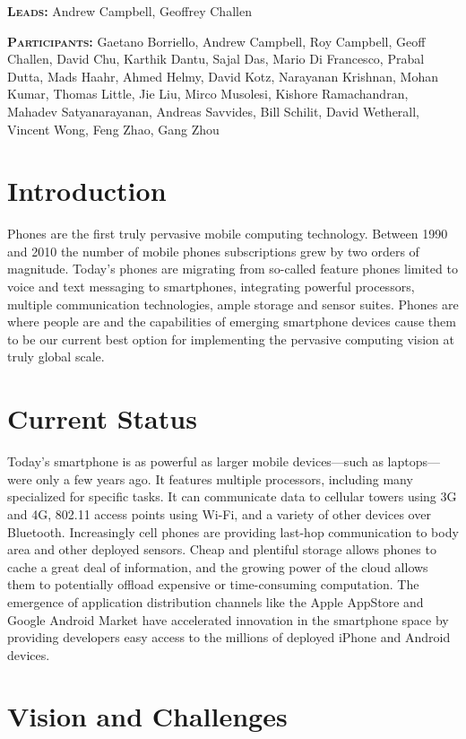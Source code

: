 \textbf{\scshape Leads:} Andrew Campbell, Geoffrey Challen

\textbf{\scshape Participants:} Gaetano Borriello, Andrew Campbell, Roy
Campbell, Geoff Challen, David Chu, Karthik Dantu, Sajal Das, Mario Di
Francesco, Prabal Dutta, Mads Haahr, Ahmed Helmy, David Kotz, Narayanan
Krishnan, Mohan Kumar, Thomas Little, Jie Liu, Mirco Musolesi, Kishore
Ramachandran, Mahadev Satyanarayanan, Andreas Savvides, Bill Schilit, David
Wetherall, Vincent Wong, Feng Zhao, Gang Zhou

\section{Introduction}

Phones are the first truly pervasive mobile computing technology. Between
1990 and 2010 the number of mobile phones subscriptions grew by two orders of
magnitude. Today’s phones are migrating from so-called feature phones limited
to voice and text messaging to smartphones, integrating powerful processors,
multiple communication technologies, ample storage and sensor suites. Phones
are where people are and the capabilities of emerging smartphone devices
cause them to be our current best option for implementing the pervasive
computing vision at truly global scale.

\section{Current Status}

Today’s smartphone is as powerful as larger mobile devices---such as
laptops---were only a few years ago. It features multiple processors, including
many specialized for specific tasks. It can communicate data to cellular
towers using 3G and 4G, 802.11 access points using Wi-Fi, and a variety of
other devices over Bluetooth. Increasingly cell phones are providing last-hop
communication to body area and other deployed sensors. Cheap and plentiful
storage allows phones to cache a great deal of information, and the growing
power of the cloud allows them to potentially offload expensive or
time-consuming computation. The emergence of application distribution
channels like the Apple AppStore and Google Android Market have accelerated
innovation in the smartphone space by providing developers easy access to the
millions of deployed iPhone and Android devices.

\section{Vision and Challenges}


